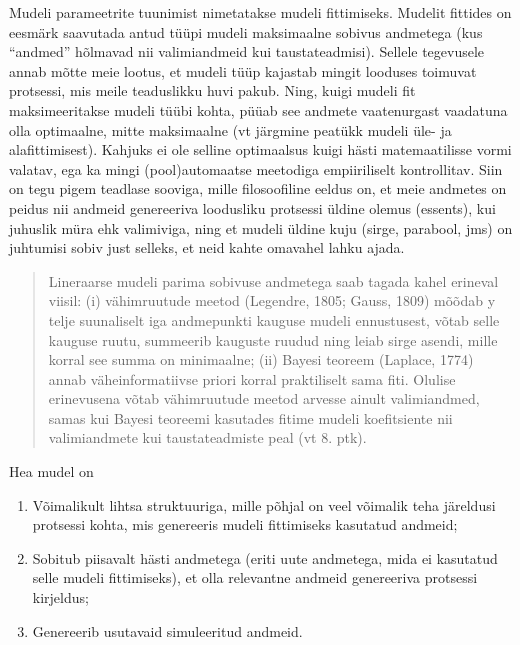 \documentclass[]{book}
\begin{document}
Mudeli parameetrite tuunimist nimetatakse mudeli fittimiseks.
Mudelit fittides on eesmärk saavutada antud tüüpi mudeli maksimaalne sobivus andmetega (kus ``andmed'' hõlmavad nii valimiandmeid kui taustateadmisi). Sellele tegevusele annab mõtte meie lootus, et mudeli tüüp kajastab mingit looduses toimuvat protsessi, mis meile teaduslikku huvi pakub. Ning, kuigi mudeli fit maksimeeritakse mudeli tüübi kohta, püüab see andmete vaatenurgast vaadatuna olla optimaalne, mitte maksimaalne (vt järgmine peatükk mudeli üle- ja alafittimisest). Kahjuks ei ole selline optimaalsus kuigi hästi matemaatilisse vormi valatav, ega ka mingi (pool)automaatse meetodiga empiiriliselt kontrollitav. Siin on tegu pigem teadlase sooviga, mille filosoofiline eeldus on, et meie andmetes on peidus nii andmeid genereeriva loodusliku protsessi üldine olemus (essents), kui juhuslik müra ehk valimiviga, ning et mudeli üldine kuju (sirge, parabool, jms) on juhtumisi sobiv just selleks, et neid kahte omavahel lahku ajada.

\begin{quote}
Lineraarse mudeli parima sobivuse andmetega saab tagada kahel erineval viisil: (i) vähimruutude meetod (Legendre, 1805; Gauss, 1809) mõõdab y telje suunaliselt iga andmepunkti kauguse mudeli ennustusest, võtab selle kauguse ruutu, summeerib kauguste ruudud ning leiab sirge asendi, mille korral see summa on minimaalne; (ii) Bayesi teoreem (Laplace, 1774) annab väheinformatiivse priori korral praktiliselt sama fiti. Olulise erinevusena võtab vähimruutude meetod arvesse ainult valimiandmed, samas kui Bayesi teoreemi kasutades fitime mudeli koefitsiente nii valimiandmete kui taustateadmiste peal (vt 8. ptk).
\end{quote}

Hea mudel on

\begin{enumerate}
\def\labelenumi{\arabic{enumi}.}
\item
  Võimalikult lihtsa struktuuriga, mille põhjal on veel võimalik teha järeldusi protsessi kohta, mis genereeris mudeli fittimiseks kasutatud andmeid;
\item
  Sobitub piisavalt hästi andmetega (eriti uute andmetega, mida ei kasutatud selle mudeli fittimiseks), et olla relevantne andmeid genereeriva protsessi kirjeldus;
\item
  Genereerib usutavaid simuleeritud andmeid.
\end{enumerate}
\end{document}
